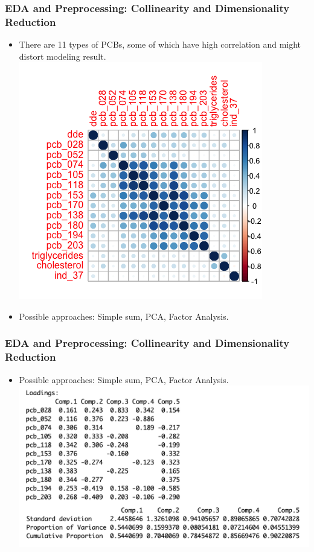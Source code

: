 \documentclass{beamer}
\begin{document}
\begin{frame}
    \frametitle{EDA and Preprocessing: Collinearity and Dimensionality Reduction}

    \begin{itemize}
        \item There are 11 types of PCBs, some of which have high correlation and might distort modeling result.
          \includegraphics[scale=0.4]{corrplot.png}
        \item Possible approaches: Simple sum, PCA, Factor Analysis.
    \end{itemize}

\end{frame}

\begin{frame}
    \frametitle{EDA and Preprocessing: Collinearity and Dimensionality Reduction}

    \begin{itemize}
        \item Possible approaches: Simple sum, PCA, Factor Analysis.
         \includegraphics[scale=0.4]{PCA.png}


    \end{itemize}
\end{frame}
\end{document}
